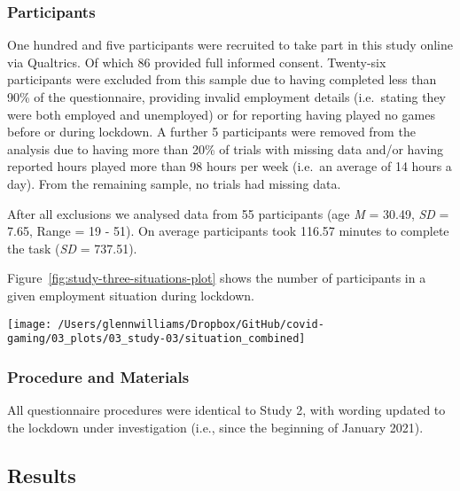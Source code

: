 \documentclass[
  english,
  man,floatsintext]{apa6}
\begin{document}
\hypertarget{participants-2}{%
\subsubsection{Participants}\label{participants-2}}

One hundred and five participants were recruited to take part in this study online via Qualtrics. Of which 86 provided full informed consent. Twenty-six participants were excluded from this sample due to having completed less than 90\% of the questionnaire, providing invalid employment details (i.e.~stating they were both employed and unemployed) or for reporting having played no games before or during lockdown. A further 5 participants were removed from the analysis due to having more than 20\% of trials with missing data and/or having reported hours played more than 98 hours per week (i.e.~an average of 14 hours a day). From the remaining sample, no trials had missing data.

After all exclusions we analysed data from 55 participants (age \emph{M} = 30.49, \emph{SD} = 7.65, Range = 19 - 51). On average participants took 116.57 minutes to complete the task (\emph{SD} = 737.51).

Figure~\ref{fig:study-three-situations-plot} shows the number of participants in a given employment situation during lockdown.

\begin{figure*}[!htbp]

{\centering \texttt{[image: /Users/glennwilliams/Dropbox/GitHub/covid-gaming/03\_plots/03\_study-03/situation\_combined]} 

}

\caption{Count of participants by self-reported (a) employment status, (b) lockdown work situation, and (c) living situation.}\label{fig:study-three-situations-plot}
\end{figure*}

\hypertarget{procedure-and-materials-2}{%
\subsubsection{Procedure and Materials}\label{procedure-and-materials-2}}

All questionnaire procedures were identical to Study 2, with wording updated to the lockdown under investigation (i.e., since the beginning of January 2021).

\hypertarget{results-2}{%
\subsection{Results}\label{results-2}}
\end{document}
